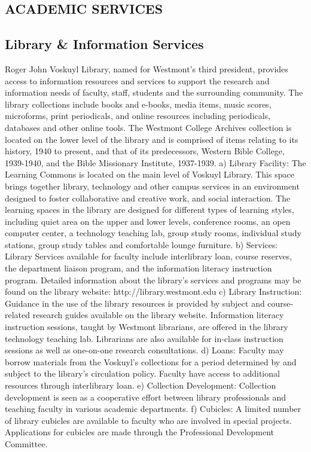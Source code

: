 \documentclass[letterpaper, 11pt]{article}
\begin{document}
	\subsection{ACADEMIC SERVICES}
	\subsection{Library \& Information Services}
		Roger John Voskuyl Library, named for Westmont's third president, provides access to information resources and services to support the research and information needs of faculty, staff, students and the surrounding community.  The library collections include books and e-books, media items, music scores, microforms, print periodicals, and online resources including periodicals, databases and other online tools.  The Westmont College Archives collection is located on the lower level of the library and is comprised of items relating to its history, 1940 to present, and that of its predecessors, Western Bible College, 1939-1940, and the Bible Missionary Institute, 1937-1939.
		a) Library Facility:  The Learning Commons is located on the main level of Voskuyl Library.  This space brings together library, technology and other campus services in an environment designed to foster collaborative and creative work, and social interaction.  The learning spaces in the library are designed for different types of learning styles, including quiet area on the upper and lower levels, conference rooms, an open computer center, a technology teaching lab, group study rooms, individual study stations, group study tables and comfortable lounge furniture.
		b) Services:  Library Services available for faculty include interlibrary loan, course reserves, the department liaison program, and the information literacy instruction program.  Detailed information about the library's services and programs may be found on the library website: http://library.westmont.edu
		c) Library Instruction:  Guidance in the use of the library resources is provided by subject and course-related research guides available on the library website.  Information literacy instruction sessions, taught by Westmont librarians, are offered in the library technology teaching lab.  Librarians are also available for in-class instruction sessions as well as one-on-one research consultations.
		d) Loans:  Faculty may borrow materials from the Voskuyl's collections for a period determined by and subject to the library's circulation policy.  Faculty have access to additional resources through interlibrary loan.
		e) Collection Development:  Collection development is seen as a cooperative effort between library professionals and teaching faculty in various academic departments.
		f) Cubicles:  A limited number of library cubicles are available to faculty who are involved in special projects.  Applications for cubicles are made through the Professional Development Committee.
\end{document}
